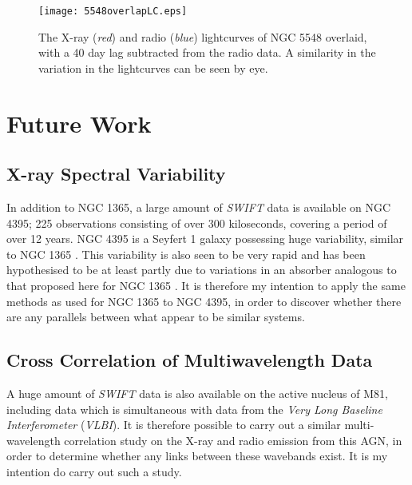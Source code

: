 \documentclass[letters,useAMS,usenatbib]{samnote}
\begin{document}
 
\begin{figure}
	
	\texttt{[image: 5548overlapLC.eps]}\hspace{1pt}
	\caption{The X-ray  ({\it red}) and radio  ({\it blue}) lightcurves of NGC 5548 overlaid, with a 40 day lag subtracted from the radio data. A similarity in the
variation in the lightcurves can be seen by eye.}
	
	\label{compLCs}
\end{figure}  
 
 

\section{Future Work}


\subsection{X-ray Spectral Variability}

In addition to NGC 1365, a large amount of {\it SWIFT} data is available on NGC 4395; 225 observations consisting of over 300 kiloseconds, covering a period of over 12
years. NGC 4395 is a Seyfert 1 galaxy possessing huge variability, similar to NGC 1365 \citep{vaughan05}. This variability is also seen to be very rapid and has been
hypothesised to be at least partly due to variations in an absorber analogous to that proposed here for NGC 1365 \citep{iwasawa00}. It is therefore my intention to apply
the same methods as used for NGC 1365 to NGC 4395, in order to discover whether there are any parallels between what appear to be similar systems.


\subsection{Cross Correlation of Multiwavelength Data}

 A huge amount of {\it SWIFT} data is also available on the active nucleus of M81, including data which is simultaneous with data from the {\it Very Long Baseline
Interferometer} ({\it VLBI}). It is therefore possible to carry out a similar multi-wavelength correlation study on the X-ray and radio emission from this AGN, in order
to determine whether any links between these wavebands exist. It is my intention do carry out such a study. 
\end{document}
